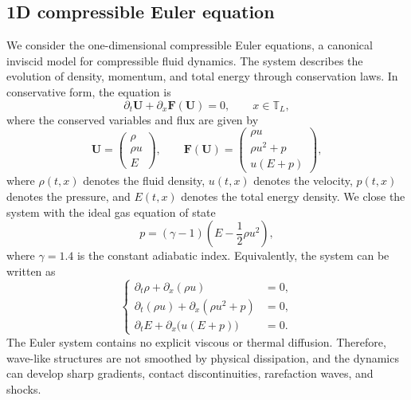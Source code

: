 \documentclass[11pt]{article}
\begin{document}
\subsection{1D compressible Euler equation} 
We consider the one-dimensional compressible Euler equations, a canonical inviscid model for compressible fluid dynamics. The system describes the evolution of density, momentum, and total energy through conservation laws. In
conservative form, the equation is
\begin{equation}
    \partial_t\mathbf{U} + \partial_x \mathbf{F}(\mathbf{U}) = 0,
    \qquad x\in \mathbb{T}_L,
    \label{eq:euler1d_conservative}
\end{equation}
where the conserved variables and flux are given by
\begin{equation}
    \mathbf{U} =
    \begin{pmatrix}
        \rho \\
        \rho u \\
        E
    \end{pmatrix},
    \qquad
    \mathbf{F}(\mathbf{U}) =
    \begin{pmatrix}
        \rho u \\
        \rho u^2 + p \\
        u(E+p)
    \end{pmatrix},
    \label{eq:euler1d_flux}
\end{equation}
where $\rho(t,x)$ denotes the fluid density, $u(t,x)$ denotes the velocity, $p(t,x)$ denotes the pressure, and $E(t,x)$ denotes the total energy density. We close the system with the ideal gas equation of state
\begin{equation*}
    p = (\gamma-1)
    \left(
        E - \frac{1}{2}\rho u^2
    \right),
    \label{eq:euler1d_eos}
\end{equation*}
where  $\gamma = 1.4$ is the constant adiabatic index. Equivalently, the system can be written as
\begin{equation*}
\begin{cases}
    \partial_t \rho + \partial_x(\rho u) &= 0,\\
    \partial_t(\rho u) + \partial_x(\rho u^2+p) &= 0,\\
    \partial_t E + \partial_x\bigl(u(E+p)\bigr) &= 0.
\end{cases}
\label{eq:euler1d_expanded}
\end{equation*}
The Euler system contains no explicit viscous or thermal diffusion. Therefore, wave-like structures are not smoothed by physical dissipation, and the dynamics can develop sharp gradients, contact discontinuities, rarefaction waves, and shocks.
\end{document}
